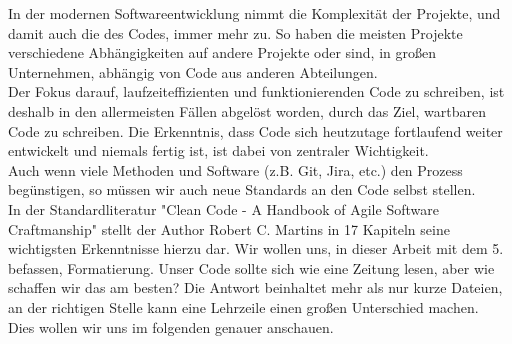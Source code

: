 In der modernen Softwareentwicklung nimmt die Komplexität der Projekte, und damit auch die des Codes, immer mehr zu.
So haben die meisten Projekte verschiedene Abhängigkeiten auf andere Projekte oder sind, in großen Unternehmen, abhängig von Code aus anderen Abteilungen.\\
Der Fokus darauf, laufzeiteffizienten und funktionierenden Code zu schreiben, ist deshalb in den allermeisten Fällen abgelöst worden, durch das Ziel, wartbaren Code zu schreiben.
Die Erkenntnis, dass Code sich heutzutage fortlaufend weiter entwickelt und niemals fertig ist, ist dabei von zentraler Wichtigkeit.\\
Auch wenn viele Methoden und Software (z.B. Git, Jira, etc.) den Prozess  begünstigen, so müssen wir auch neue Standards an den Code selbst stellen.\\
In der Standardliteratur "Clean Code - A Handbook of Agile Software Craftmanship" stellt der Author Robert C. Martins in 17 Kapiteln seine wichtigsten Erkenntnisse hierzu dar.
Wir wollen uns, in dieser Arbeit mit dem 5. befassen, Formatierung.
Unser Code sollte sich wie eine Zeitung lesen, aber wie schaffen wir das am besten?
Die Antwort beinhaltet mehr als nur kurze Dateien, an der richtigen Stelle kann eine Lehrzeile einen großen Unterschied machen.\\
Dies wollen wir uns im folgenden genauer anschauen.